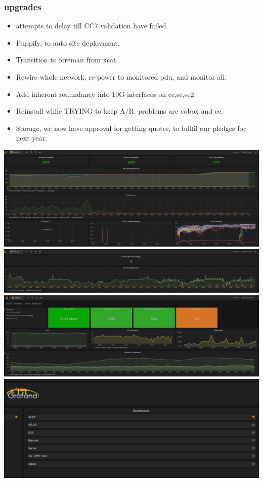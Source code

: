 \documentclass{beamer}
\begin{document}
\begin{frame}
  \frametitle{upgrades}
  \begin{itemize}
    \item attempts to delay till CC7 validation have failed.
    \item Puppify, to auto site deployment.
    \item Transition to foreman from xcat.
    \item Rewire whole network, re-power to monitored pdu, and monitor all.
    \item Add inherent redundancy into 10G interfaces on ce,se,se2.
    \item Reinstall while TRYING to keep A/R. problems are vobox and ce. 
    \item Storage, we now have approval for getting quotes, to fullfil our pledges for next year.
  \end{itemize}
\end{frame}
\begin{frame}
  \includegraphics[scale=0.25]{ALICEProcessing-Grafana.pdf}\\
  \includegraphics[scale=0.25]{ATLASProcessing-Grafana.pdf}\\
  \includegraphics[scale=0.25]{Server50-Grafana.pdf}\\
  \includegraphics[scale=0.25]{GrafanaMenu.pdf}
\end{frame}
\end{document}
